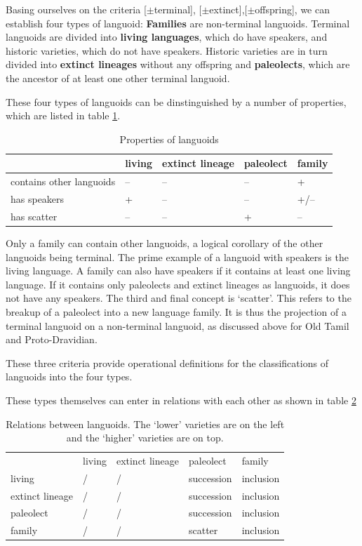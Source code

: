 \documentclass[a4paper,10pt]{article}
\begin{document}
Basing ourselves on the criteria [$\pm$terminal], [$\pm$extinct],[$\pm$offspring], we can establish four types of languoid:
\textbf{Families} are non-terminal languoids. Terminal languoids are divided into \textbf{living languages}, which do have speakers, and historic varieties, which do not have speakers. Historic varieties are in turn divided into \textbf{extinct lineages} without any offspring and \textbf{paleolects}, which are the ancestor of at least one other terminal languoid.

These four types of languoids can be dinstinguished by a number of properties, which are listed in table \ref{tab:properties}.

\begin{table}
\begin{center}
  \begin{tabular}{lllll}
  & living & extinct lineage & paleolect & family\\
  \hline
  contains other languoids & -- & -- & -- & +\\
  has speakers & + & -- & -- & +/--\\
  has scatter & -- & -- & + & --\\
  \end{tabular}
\caption{Properties of languoids}
\label{tab:properties}
\end{center}
\end{table}

Only a family can contain other languoids, a logical corollary of the other languoids being terminal. The prime example of a languoid with speakers is the living language. A family can also have speakers if it contains at least one living language. If it contains only paleolects and extinct lineages as languoids, it does not have any speakers. The third and final concept is `scatter'. This refers to the breakup of a paleolect into a new language family. It is thus the 
projection of a terminal languoid on a non-terminal languoid, as discussed above for Old Tamil and Proto-Dravidian.

These three criteria provide operational definitions for the classifications of languoids into the four types.

These types themselves can enter in relations with each other as shown in table \ref{tab:languoidrelations}


\begin{table}
\begin{center}
\begin{tabular}{lllll}
  & living & extinct lineage & paleolect & family\\
living & / & / & succession & inclusion\\
extinct lineage & / & / & succession & inclusion\\
paleolect & / & / & succession & inclusion\\
family & / & / & scatter & inclusion
\end{tabular}
\caption{Relations between languoids. The `lower' varieties are on the left and the `higher' varieties are on top.}
\label{tab:languoidrelations}
\end{center}
\end{table}
\end{document}
